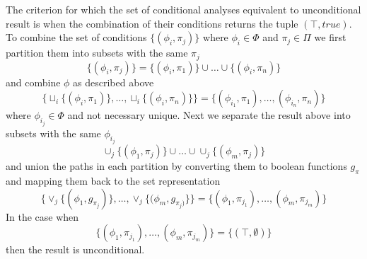 The criterion for which the set of conditional analyses equivalent to unconditional result is when the combination of their conditions returns the tuple $(\top, true)$. To combine the set of conditions $\{(\phi_i,\pi_j)\}$ where $\phi_i\in \Phi$ and $\pi_j\in\Pi$ we first partition them into subsets with the same $\pi_j$ 
$$
\{(\phi_i,\pi_j)\} = \{(\phi_i, \pi_1)\}\cup\dots\cup \{(\phi_i, \pi_n)\} 
$$
and combine $\phi$ as described above
$$
\{\sqcup_i\{(\phi_i, \pi_1)\},\dots,\sqcup_i\{(\phi_i, \pi_n)\} \}= \{(\phi_{i_1},\pi_1),\dots,(\phi_{i_n},\pi_n)\}
$$
where $\phi_{i_j}\in\Phi$ and not necessary unique. Next we separate the result above into subsets with the same $\phi_{i_j}$
$$
\cup_j\{(\phi_1,\pi_j)\}\cup\dots\cup\cup_j\{(\phi_m,\pi_j)\}
$$
and union the paths in each partition by converting them to boolean functions $g_{\pi}$ and mapping them back to the set representation
$$
\{\lor_j\{(\phi_1,g_{\pi_j})\}, \dots, \lor_j\{(\phi_m,g_{\pi_j)}\}\} = \{(\phi_1,\pi_{j_1}),\dots,(\phi_m,\pi_{j_m})\}
$$
In the case when
$$
\{(\phi_1,\pi_{j_1}),\dots,(\phi_m,\pi_{j_m})\} = \{(\top,\emptyset)\}
$$
then the result is unconditional.